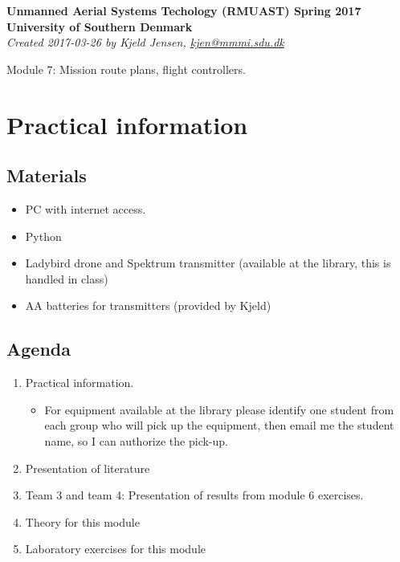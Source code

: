 \documentclass[a4paper,10pt,fleqn]{article}
\begin{document}
\Large
\textbf{Unmanned Aerial Systems Techology (RMUAST) Spring 2017 \\ University of Southern Denmark} \vspace{2mm}\\
\large \textit{Created 2017-03-26 by Kjeld Jensen, \href{mailto:kjen@mmmi.sdu.dk}{kjen@mmmi.sdu.dk}} \\

\vspace{3mm}

\LARGE Module 7: Mission route plans, flight controllers.


\normalsize

\section{Practical information}

\subsection{Materials}

\begin{itemize}
\item PC with internet access.
\item Python
\item Ladybird drone and Spektrum transmitter (available at the library, this is handled in class)
\item AA batteries for transmitters (provided by Kjeld)

\end{itemize}

\subsection{Agenda}

\begin{enumerate}
	\item Practical information.
\begin{itemize}
	\item For equipment available at the library please identify one student from each group who will pick up the equipment, then email me the student name, so I can authorize the pick-up.
\end{itemize}
	\item Presentation of literature 
	\item Team 3 and team 4: Presentation of results from module 6 exercises.
	\item Theory for this module
	\item Laboratory exercises for this module 
\end{enumerate}
\end{document}
